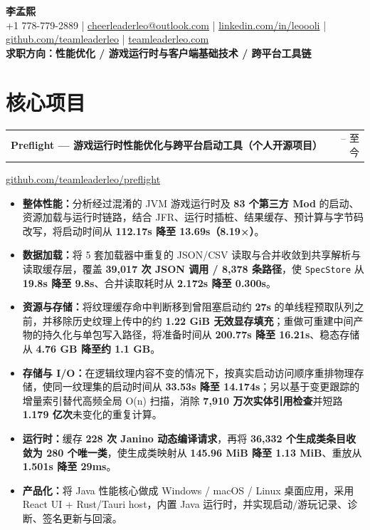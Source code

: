 \documentclass[UTF8,a4paper,11pt,fontset=none]{ctexart}
\makeatletter
\newcommand{\roleline}[2]{%
  \begin{tabularx}{\textwidth}{@{}Xr@{}}
    {\sffamily\bfseries\fontsize{10.78pt}{12.05pt}\selectfont #1} & {\sffamily\fontsize{8.8pt}{10.2pt}\selectfont #2}
  \end{tabularx}\vspace{-0.05pt}
}
\newcommand{\resumeliststart}{\begin{itemize}[leftmargin=1.42em,label=\textbullet,itemsep=0pt,parsep=0pt,topsep=-0.05pt,partopsep=0pt]}
\newcommand{\resumeitem}[1]{\item\fontsize{10.12pt}{10.68pt}\selectfont\RaggedRight #1}
\newcommand{\resumelistend}{\end{itemize}\vspace{0pt}}
\makeatother
\begin{document}
\begin{center}
  {\sffamily\bfseries\fontsize{18.6pt}{20.5pt}\selectfont 李孟熙}\\[0.65pt]
  {\sffamily\fontsize{8.35pt}{9.35pt}\selectfont
  +1 778-779-2889 \;|\;
  \href{mailto:cheerleaderleo@outlook.com}{cheerleaderleo@outlook.com} \;|\;
  \href{https://www.linkedin.com/in/leoooli/}{linkedin.com/in/leoooli} \;|\;
  \href{https://github.com/teamleaderleo}{github.com/teamleaderleo} \;|\;
  \href{https://teamleaderleo.com/}{teamleaderleo.com}}\\[0.55pt]
  {\sffamily\bfseries\fontsize{9.55pt}{11.2pt}\selectfont 求职方向：性能优化 / 游戏运行时与客户端基础技术 / 跨平台工具链}
\end{center}
\vspace{-4.0pt}

\section{核心项目}
\roleline{Preflight — 游戏运行时性能优化与跨平台启动工具（个人开源项目）}{2026.07 -- 至今}
{\sffamily\fontsize{9.0pt}{10.08pt}\selectfont\href{https://github.com/teamleaderleo/preflight}{github.com/teamleaderleo/preflight}}\vspace{0.15pt}
\resumeliststart
  \resumeitem{\textsf{\bfseries 整体性能：}分析经过混淆的 JVM 游戏运行时及 \textbf{83 个第三方 Mod} 的启动、资源加载与运行时链路，结合 JFR、运行时插桩、结果缓存、预计算与字节码改写，将启动时间从 \textbf{112.17s 降至 13.69s（8.19×）}。}
  \resumeitem{\textsf{\bfseries 数据加载：}将 5 套加载器中重复的 JSON/CSV 读取与合并收敛到共享解析与读取缓存层，覆盖 \textbf{39,017 次 JSON 调用 / 8,378 条路径}，使 \texttt{SpecStore} 从 \textbf{19.8s 降至 9.8s}、合并读取耗时从 \textbf{2.172s 降至 0.300s}。}
  \resumeitem{\textsf{\bfseries 资源与存储：}将纹理缓存命中判断移到曾阻塞启动约 \textbf{27s} 的单线程预取队列之前，并移除历史纹理上传中的约 \textbf{1.22 GiB 无效显存填充}；重做可重建中间产物的持久化与单包写入路径，将准备时间从 \textbf{200.77s 降至 16.21s}、稳态存储从 \textbf{4.76 GB 降至约 1.1 GB}。}
  \resumeitem{\textsf{\bfseries 存储与 I/O：}在逻辑纹理内容不变的情况下，按真实启动访问顺序重排物理存储，使同一纹理集的启动时间从 \textbf{33.53s 降至 14.174s}；另以基于变更跟踪的增量索引替代高频全局 O(n) 扫描，消除 \textbf{7,910 万次实体引用检查}并短路 \textbf{1.179 亿次}未变化的重复计算。}
  \resumeitem{\textsf{\bfseries 运行时：}缓存 \textbf{228 次 Janino 动态编译请求}，再将 \textbf{36,332 个生成类条目收敛为 280 个唯一类}，使生成类映射从 \textbf{145.96 MiB 降至 1.13 MiB}、重放从 \textbf{1.501s 降至 29ms}。}
  \resumeitem{\textsf{\bfseries 产品化：}将 Java 性能核心做成 Windows / macOS / Linux 桌面应用，采用 React UI + Rust/Tauri host，内置 Java 运行时，并实现启动/游玩记录、诊断、签名更新与回滚。}
\resumelistend
\end{document}
